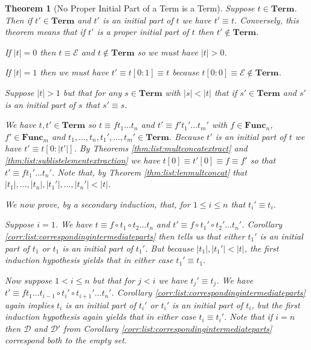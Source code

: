 \documentclass[12pt]{article}
\theoremstyle{break}
\theoremstyle{break}
\newtheorem{theorem}{Theorem}[section]
\theoremstyle{break}
\theoremstyle{break}
\theoremstyle{break}
\newtheorem{informal definition}[definition]{Informal Definition}
\newcommand{\mc}[1]{\mathcal{#1}}
\begin{document}
\begin{theorem}[No Proper Initial Part of a Term is a Term]
\label{thm:read:termnopropinit}
Suppose $t \in\textbf{Term}$.
Then if $t'\in\textbf{Term}$ and $t'$ is an initial part of $t$ we have $t'\equiv t$.
Conversely, this theorem means that if $t'$ is a proper initial part of $t$ then $t'\not\in\textbf{Term}$.


If $|t|=0$ then $t\equiv \mc{E}$ and $t\not \in \textbf{Term}$ so we must have $|t|>0$.

If $|t|=1$ then we must have $t'\equiv t[0:1]\equiv t$ because $t[0:0]\equiv \mc{E}\not\in\textbf{Term}$.

Suppose $|t|>1$ but that for any $s\in\textbf{Term}$ with $|s|<|t|$ that if $s'\in\textbf{Term}$  and $s'$ is an initial part of $s$ that $s'\equiv s$.

We have $t, t' \in \textbf{Term}$ so $t\equiv f t_1\ldots t_n$ and $t' \equiv f' t_1'\ldots t_m'$ with $f\in\textbf{Func}_n$, $f'\in\textbf{Func}_m$ and $t_1, \ldots,t_n,t_1',\ldots,t_m'\in\textbf{Term}$.
Because $t'$ is an initial part of $t$ we have $t' \equiv t[0:|t'|]$.
By Theorems \ref{thm:list:multconcatextract} and \ref{thm:list:sublistelementextraction} we have $t[0]\equiv t'[0] \equiv f\equiv f'$ so that $t' \equiv f t_1'\ldots t_n'$.
Note that, by Theorem \ref{thm:list:lenmultconcat} that $|t_1|,\ldots,|t_n|,|t_1'|,\ldots,|t_n'| < |t|$.

We now prove, by a secondary induction, that, for $1\le i \le n$ that $t_i'\equiv t_i$.

Suppose $i=1$.
We have $t\equiv f \circ t_1 \circ t_2\ldots t_n$ and $t' \equiv f \circ t_1' \circ t_2'\ldots t_n'$.
Corollary \ref{corr:list:correspondingintermediateparts} then tells us that either $t_1'$ is an initial part of $t_1$ or $t_1$ is an initial part of $t_1'$.
But because $|t_1|, |t_1'|<|t|$, the first induction hypothesis yields that in either case $t_1'\equiv t_1$.

Now suppose $1<i \le n$ but that for $j<i$ we have $t_j' \equiv t_j$.
We have $t'\equiv f t_1\ldots t_{i-1} \circ t_i' \circ t_{i+1}'\ldots t_n'$.
Corollary \ref{corr:list:correspondingintermediateparts} again implies $t_i$ is an initial part of $t_i'$ or $t_i'$ is an initial part of $t_i$, but the first induction hypothesis again yields that in either case $t_i\equiv t_i'$. Note that if $i = n$ then $\mc{D}$ and $\mc{D}'$ from Corollary \ref{corr:list:correspondingintermediateparts} correspond both to the empty set.
\end{theorem}
\end{document}
